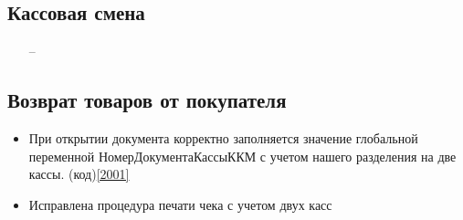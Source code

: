 \subsection{Кассовая смена}

\begin{itemize}
	\item [--]
\end{itemize}



\subsection{Возврат товаров от покупателя}
\begin{itemize}
	\item При открытии документа корректно заполняется значение глобальной переменной НомерДокументаКассыККМ
	 с учетом нашего разделения на две кассы. (код)\ref{2001}
    \item Исправлена процедура печати чека с учетом двух касс

\end{itemize}


